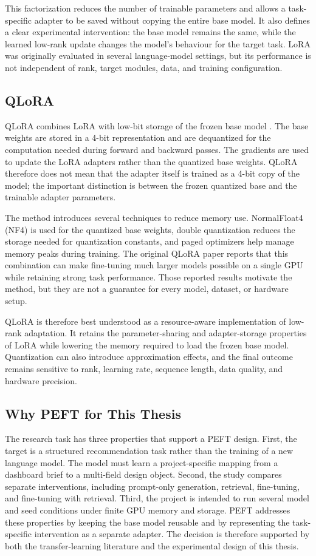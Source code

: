 This factorization reduces the number of trainable parameters and allows a task-specific adapter to be saved without copying the entire base model. It also defines a clear experimental intervention: the base model remains the same, while the learned low-rank update changes the model's behaviour for the target task. LoRA was originally evaluated in several language-model settings, but its performance is not independent of rank, target modules, data, and training configuration.

\subsection{QLoRA}

QLoRA combines LoRA with low-bit storage of the frozen base model \cite{dettmers2023qlora}. The base weights are stored in a 4-bit representation and are dequantized for the computation needed during forward and backward passes. The gradients are used to update the LoRA adapters rather than the quantized base weights. QLoRA therefore does not mean that the adapter itself is trained as a 4-bit copy of the model; the important distinction is between the frozen quantized base and the trainable adapter parameters.

The method introduces several techniques to reduce memory use. NormalFloat4 (NF4) is used for the quantized base weights, double quantization reduces the storage needed for quantization constants, and paged optimizers help manage memory peaks during training. The original QLoRA paper reports that this combination can make fine-tuning much larger models possible on a single GPU while retaining strong task performance. Those reported results motivate the method, but they are not a guarantee for every model, dataset, or hardware setup.

QLoRA is therefore best understood as a resource-aware implementation of low-rank adaptation. It retains the parameter-sharing and adapter-storage properties of LoRA while lowering the memory required to load the frozen base model. Quantization can also introduce approximation effects, and the final outcome remains sensitive to rank, learning rate, sequence length, data quality, and hardware precision.

\subsection{Why PEFT for This Thesis}

The research task has three properties that support a PEFT design. First, the target is a structured recommendation task rather than the training of a new language model. The model must learn a project-specific mapping from a dashboard brief to a multi-field design object. Second, the study compares separate interventions, including prompt-only generation, retrieval, fine-tuning, and fine-tuning with retrieval. Third, the project is intended to run several model and seed conditions under finite GPU memory and storage. PEFT addresses these properties by keeping the base model reusable and by representing the task-specific intervention as a separate adapter. The decision is therefore supported by both the transfer-learning literature and the experimental design of this thesis.


